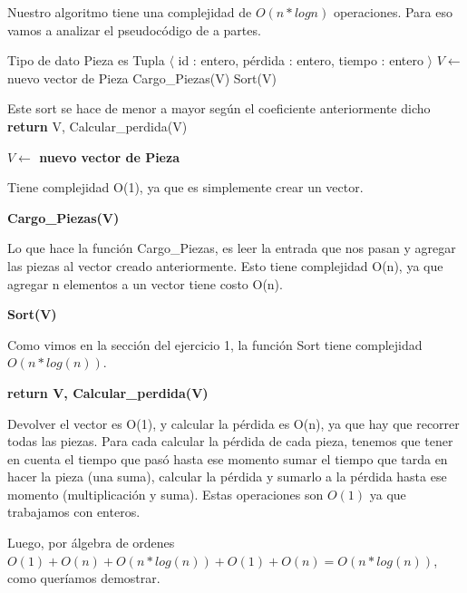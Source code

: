 Nuestro algoritmo tiene una complejidad de $O(n*log n)$ operaciones. Para eso vamos a analizar el pseudocódigo de a partes.

\begin{pseudo}
\State Tipo de dato Pieza es Tupla $\langle$ id : entero, pérdida : entero, tiempo : entero $\rangle$
        \State $V \leftarrow$ nuevo vector de Pieza 
        \State Cargo\_Piezas(V) 
        \State Sort(V) 
        
        \Comment Este sort se hace de menor a mayor según el coeficiente anteriormente dicho
        \State \textbf{return} V, Calcular\_perdida(V) 
    \EndProcedure
\end{pseudo}

\begin{pseudo}
 \State  \textbf{$V \leftarrow$ nuevo vector de Pieza}
\end{pseudo}

Tiene complejidad O(1), ya que es simplemente crear un vector.

\begin{pseudo}
 \State \textbf{Cargo\_Piezas(V)}
\end{pseudo}

Lo que hace la función Cargo\_Piezas, es leer la entrada que nos pasan y agregar las piezas al vector creado anteriormente. Esto tiene complejidad O(n), ya que agregar n elementos a un vector tiene costo O(n).

\begin{pseudo}
 \State \textbf{Sort(V)}
\end{pseudo}

Como vimos en la sección del ejercicio 1, la función Sort tiene complejidad $O(n*log(n))$.

\begin{pseudo}
 \State \textbf{return V, Calcular\_perdida(V)}
\end{pseudo}

Devolver el vector es O(1), y calcular la pérdida es O(n), ya que hay que recorrer todas las piezas. Para cada calcular la pérdida de cada pieza, tenemos que tener en cuenta el tiempo que pasó hasta ese momento sumar el tiempo que tarda en hacer la pieza (una suma), calcular la pérdida y sumarlo a la pérdida hasta ese momento (multiplicación y suma). Estas operaciones son $O(1)$ ya que trabajamos con enteros.

Luego, por álgebra de ordenes $O(1) + O(n) + O(n*log(n)) + O(1) + O(n) = O(n*log(n))$, como queríamos demostrar.